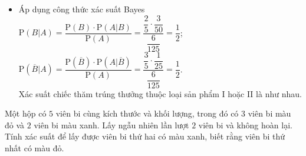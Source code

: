 \begin{ex}
{\begin{itemize}
			$\mathrm{P}(A)=\mathrm{P}(B)\cdot \mathrm{P}\left(A|B\right)+\mathrm{P}\left(\overline{B}\right)\cdot \mathrm{P}\left(A|\overline{B}\right)=\dfrac{2}{5}\cdot \dfrac{3}{50}+\dfrac{3}{5}\cdot \dfrac{1}{25}=\dfrac{6}{125}=0{,}048$.
			\item Áp dụng công thức xác suất Bayes\\
			$\mathrm{P}\left(B|A\right)=\dfrac{\mathrm{P}(B)\cdot \mathrm{P}\left(A|B\right)}{\mathrm{P}(A)}=\dfrac{\dfrac{2}{5}\cdot \dfrac{3}{50}}{\dfrac{6}{125}}=\dfrac{1}{2}$; $\mathrm{P}\left(\overline{B}|A\right)=\dfrac{\mathrm{P}\left(\overline{B}\right)\cdot \mathrm{P}\left(A|\overline{B}\right)}{\mathrm{P}(A)}=\dfrac{\dfrac{3}{5}\cdot \dfrac{1}{25}}{\dfrac{6}{125}}=\dfrac{1}{2}$.\\
			Xác suất chiếc thăm trúng thưởng thuộc loại sản phẩm I hoặc II là như nhau.
		\end{itemize}
	}
\end{ex}

\begin{ex}%
	Một hộp có $5$ viên bi cùng kích thước và khối lượng, trong đó có $3$ viên bi màu đỏ và
	$2$ viên bi màu xanh. Lấy ngẫu nhiên lần lượt $2$ viên bi và không hoàn lại. Tính xác suất
	để lấy được viên bi thứ hai có màu xanh, biết rằng viên bi thứ nhất có màu đỏ.
\end{ex}

